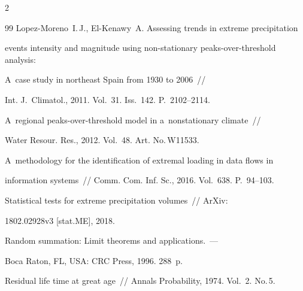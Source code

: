 \begin{multicols}{2}
{{\begin{thebibliography}{99}
{Lopez-Moreno~I.\,J., El-Kenawy~A.} Assessing trends in extreme precipitation 


events intensity and magnitude using non-stationary peaks-over-threshold analysis: 


A~case study in northeast Spain from 1930 to 2006~// 


Int. J.~Climatol., 2011. Vol.~31. Iss.~142. P.~2102--2114.







 A~regional peaks-over-threshold model in a~nonstationary climate~// 


Water Resour. Res., 2012. Vol.~48. Art. No.\,W11533.









A~methodology for the identification of extremal loading in data flows in 


information systems~// Comm. Com. Inf. Sc., 2016. Vol.~638. P.~94--103.









Statistical tests for extreme precipitation volumes~// \mbox{ArXiv}:\linebreak


1802.02928v3 [stat.ME],  2018.









Random summation: Limit theorems and applications.~--- 


Boca Raton, FL, USA: CRC Press, 1996. 288~p.









Residual life time at great age~// Annals Probability, 1974. Vol.~2. No.\,5.



\end{thebibliography}}}
\end{multicols}
